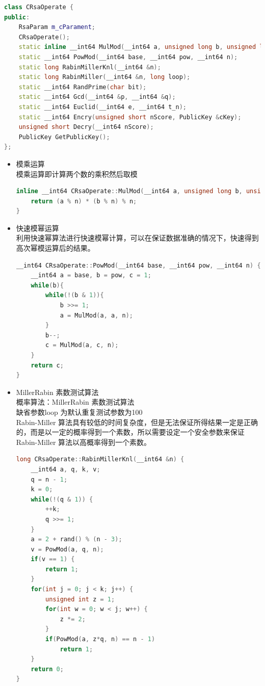 \documentclass[UTF8,a4paper,10pt]{ctexart}
\begin{document}
\begin{lstlisting}[language = c++]
class CRsaOperate {
public:
    RsaParam m_cParament;  
    CRsaOperate(); 
    static inline __int64 MulMod(__int64 a, unsigned long b, unsigned long n);
    static __int64 PowMod(__int64 base, __int64 pow, __int64 n);
    static long RabinMillerKnl(__int64 &n);
    static long RabinMiller(__int64 &n, long loop);
    static __int64 RandPrime(char bit);
    static __int64 Gcd(__int64 &p, __int64 &q);
    static __int64 Euclid(__int64 e, __int64 t_n);
    static __int64 Encry(unsigned short nScore, PublicKey &cKey);
    unsigned short Decry(__int64 nScore);
    PublicKey GetPublicKey();
};
\end{lstlisting}

\begin{itemize}
  \item 模乘运算\\ 
  模乘运算即计算两个数的乘积然后取模
  \begin{lstlisting}[language = c++]
inline __int64 CRsaOperate::MulMod(__int64 a, unsigned long b, unsigned long n) {
    return (a % n) * (b % n) % n;
}
\end{lstlisting}
  \item 快速模幂运算\\
  利用快速幂算法进行快速模幂计算，可以在保证数据准确的情况下，快速得到高次幂模运算后的结果。
  \begin{lstlisting}[language = c++]
__int64 CRsaOperate::PowMod(__int64 base, __int64 pow, __int64 n) {
    __int64 a = base, b = pow, c = 1;
    while(b){
        while(!(b & 1)){
            b >>= 1;
            a = MulMod(a, a, n);
        }
        b--;
        c = MulMod(a, c, n);
    }
    return c;
}
  \end{lstlisting}
  \item MillerRabin 素数测试算法\\
  概率算法：MillerRabin 素数测试算法\\
  缺省参数loop 为默认重复测试参数为100\\
  Rabin-Miller 算法具有较低的时间复杂度，但是无法保证所得结果一定是正确的，而是以一定的概率得到一个素数，所以需要设定一个安全参数来保证Rabin-Miller 算法以高概率得到一个素数。
  \begin{lstlisting}[language = c++]
long CRsaOperate::RabinMillerKnl(__int64 &n) {
    __int64 a, q, k, v;
    q = n - 1;
    k = 0;
    while(!(q & 1)) {
        ++k;
        q >>= 1;
    }
    a = 2 + rand() % (n - 3);
    v = PowMod(a, q, n);
    if(v == 1) {
        return 1;
    }
    for(int j = 0; j < k; j++) {
        unsigned int z = 1;
        for(int w = 0; w < j; w++) {
            z *= 2;
        }
        if(PowMod(a, z*q, n) == n - 1)
            return 1;
    }
    return 0;
}



\end{lstlisting}
\end{itemize}
\end{document}
